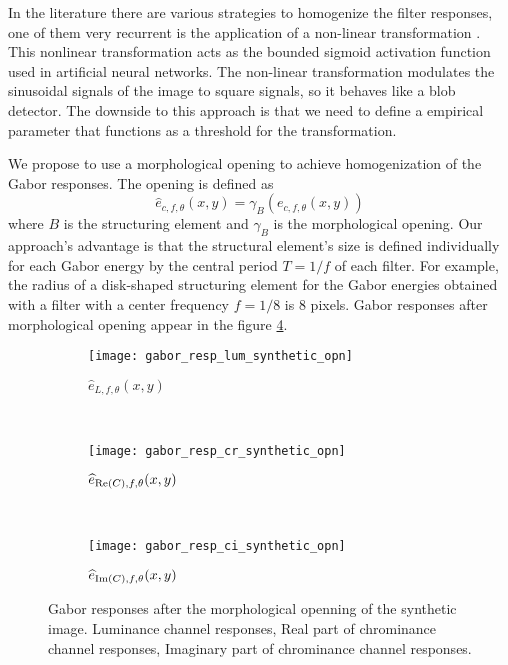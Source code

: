 In the literature there are various strategies to homogenize the filter responses, one of them very recurrent is the application of a non-linear transformation \citep{Jain.Farrokhnia:IJPR:1991}. This nonlinear transformation acts as the bounded sigmoid activation function used in artificial neural networks. The non-linear transformation modulates the sinusoidal signals of the image to square signals, so it behaves like a blob detector. The downside to this approach is that we need to define a empirical parameter that functions as a threshold for the transformation.

We propose to use a morphological opening to achieve homogenization of the Gabor responses. The opening is defined as
\begin{equation}\label{eq:gabor_energy_opn}
	\widehat{e}_{c, f, \theta}(x,y) = \gamma_B(e_{c, f, \theta}(x,y)) 
\end{equation}
where $B$ is the structuring element and $\gamma_B$ is the morphological opening. Our approach's advantage is that the structural element's size is defined individually for each Gabor energy by the central period $ T=1 / f $ of each filter. For example, the radius of a disk-shaped structuring element for the Gabor energies obtained with a filter with a center frequency $ f = 1/8 $ is 8 pixels. Gabor responses after morphological opening appear in the figure \ref{fig:synthetic_img_gresponses_opn}.
\begin{figure}[!ht]
    \centering
    \begin{subfigure}[b]{\textwidth}   
        \texttt{[image: gabor\_resp\_lum\_synthetic\_opn]}
        \caption{$\widehat{e}_{L, f, \theta}(x,y)$} 
        \label{fig:lum_gabor_energies_opn}
    \end{subfigure} \\ [2ex]   
    \begin{subfigure}[b]{\textwidth}   
    	\texttt{[image: gabor\_resp\_cr\_synthetic\_opn]}
    	\caption{$\widehat{e}_{\mathrm{Re}(C), f, \theta}(x,y)$}
        \label{fig:cr_gabor_energies_opn}
    \end{subfigure} \\ [2ex]    	
    \begin{subfigure}[b]{\textwidth}  
        \texttt{[image: gabor\_resp\_ci\_synthetic\_opn]}
        \caption{$\widehat{e}_{\mathrm{Im}(C), f, \theta}(x,y)$}
        \label{fig:ci_gabor_energies_opn} 
    \end{subfigure} 
    	    
    \caption{Gabor responses after the morphological openning of the synthetic image.  Luminance channel responses,  Real part of chrominance channel responses,  Imaginary part of chrominance channel responses.}\label{fig:synthetic_img_gresponses_opn}    
\end{figure}


